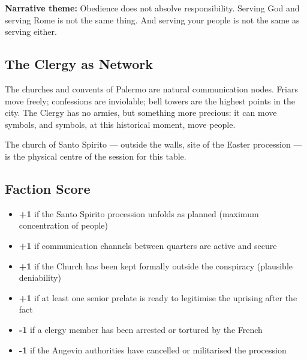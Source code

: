 \textbf{Narrative theme:} Obedience does not absolve responsibility.
Serving God and serving Rome is not the same thing. And serving your
people is not the same as serving either.

\subsection{The Clergy as Network}

The churches and convents of Palermo are natural communication nodes.
Friars move freely; confessions are inviolable; bell towers are the
highest points in the city. The Clergy has no armies, but something
more precious: it can move symbols, and symbols, at this historical
moment, move people.

The church of Santo Spirito --- outside the walls, site of the Easter
procession --- is the physical centre of the session for this table.

\subsection{Faction Score}

\begin{itemize}[nosep]
  \item \textbf{+1} if the Santo Spirito procession unfolds as planned
    (maximum concentration of people)
  \item \textbf{+1} if communication channels between quarters are
    active and secure
  \item \textbf{+1} if the Church has been kept formally outside the
    conspiracy (plausible deniability)
  \item \textbf{+1} if at least one senior prelate is ready to
    legitimise the uprising after the fact
  \item \textbf{-1} if a clergy member has been arrested or tortured
    by the French
  \item \textbf{-1} if the Angevin authorities have cancelled or
    militarised the procession
\end{itemize}


